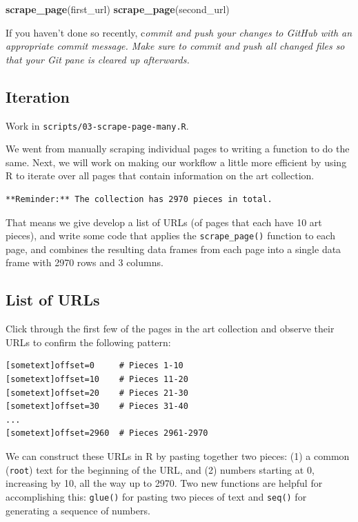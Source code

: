 \documentclass[
]{article}
\newenvironment{Shaded}{\begin{snugshade}}{\end{snugshade}}
\newcommand{\FunctionTok}[1]{\textcolor[rgb]{0.13,0.29,0.53}{\textbf{#1}}}
\newcommand{\NormalTok}[1]{#1}
\begin{document}
\begin{Shaded}
\begin{Highlighting}[]
\FunctionTok{scrape\_page}\NormalTok{(first\_url)}
\FunctionTok{scrape\_page}\NormalTok{(second\_url)}
\end{Highlighting}
\end{Shaded}

If you haven't done so recently, c\emph{ommit and push your changes to
GitHub with an appropriate commit message. Make sure to commit and push
all changed files so that your Git pane is cleared up afterwards.}

\subsection{Iteration}\label{iteration}

Work in \texttt{scripts/03-scrape-page-many.R}.

We went from manually scraping individual pages to writing a function to
do the same. Next, we will work on making our workflow a little more
efficient by using R to iterate over all pages that contain information
on the art collection.

\begin{verbatim}
**Reminder:** The collection has 2970 pieces in total.
\end{verbatim}

That means we give develop a list of URLs (of pages that each have 10
art pieces), and write some code that applies the
\texttt{scrape\_page()} function to each page, and combines the
resulting data frames from each page into a single data frame with 2970
rows and 3 columns.

\subsection{List of URLs}\label{list-of-urls}

Click through the first few of the pages in the art collection and
observe their URLs to confirm the following pattern:

\begin{verbatim}
[sometext]offset=0     # Pieces 1-10
[sometext]offset=10    # Pieces 11-20
[sometext]offset=20    # Pieces 21-30
[sometext]offset=30    # Pieces 31-40
...
[sometext]offset=2960  # Pieces 2961-2970
\end{verbatim}

We can construct these URLs in R by pasting together two pieces: (1) a
common (\texttt{root}) text for the beginning of the URL, and (2)
numbers starting at 0, increasing by 10, all the way up to 2970. Two new
functions are helpful for accomplishing this: \texttt{glue()} for
pasting two pieces of text and \texttt{seq()} for generating a sequence
of numbers.
\end{document}
